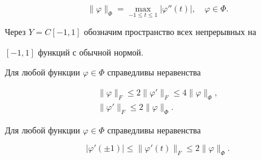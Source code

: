 $$ 


\|\varphi\|_\Phi=\max_{-1\le t\le1}|\varphi''(t)|,\quad \varphi\in\Phi. 


$$ 


Через $Y=C[-1,1]$ обозначим пространство всех непрерывных на 


$[-1,1]$ функций с обычной нормой. 


 


\begin{lem} 


Для любой функции $\varphi\in\Phi$ справедливы неравенства 


\begin{gather} 


\|\varphi\|_F\le2\|\varphi'\|_F\le4\|\varphi\|_\Phi, \\ 


% 


\|\varphi'\|_F\le2\|\varphi\|_\Phi. 


\end{gather} 


\end{lem} 


 


\begin{cornonum} 


Для любой функции $\varphi\in\Phi$ справедливы неравенства 


$$ 


|\varphi'(\pm1)|\le\|\varphi'(t)\|_F\le2\|\varphi\|_\Phi. 


$$ 


\end{cornonum} 


 


